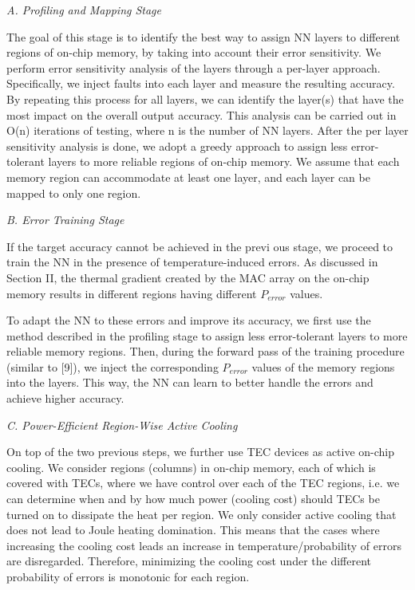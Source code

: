 \documentclass[sigconf]{acmart}
\begin{document}
\textit{A. Profiling and Mapping Stage} 

The goal of this stage is to identify the best way to assign NN layers to different regions of on-chip memory, by taking into account their error sensitivity. We perform error sensitivity analysis of the layers through a per-layer approach. Specifically, we inject faults into each layer and measure the resulting accuracy. By repeating this process for all layers, we can identify the layer(s) that have the most impact on the overall output accuracy. This analysis can be carried out in O(n) iterations of testing, where n is the number of NN layers. After the per layer sensitivity analysis is done, we adopt a greedy approach to assign less error-tolerant layers to more reliable regions of on-chip memory. We assume that each memory region can accommodate at least one layer, and each layer can be mapped to only one region. 

\textit{B. Error Training Stage} 

If the target accuracy cannot be achieved in the previ ous stage, we proceed to train the NN in the presence of temperature-induced errors. As discussed in Section II, the thermal gradient created by the MAC array on the on-chip memory results in different regions having different $P_{error}$ values. 

To adapt the NN to these errors and improve its accuracy, we first use the method described in the profiling stage to assign less error-tolerant layers to more reliable memory regions. Then, during the forward pass of the training procedure (similar to [9]), we inject the corresponding $P_{error}$ values of the memory regions into the layers. This way, the NN can learn to better handle the errors and achieve higher accuracy. 

\textit{C. Power-Efficient Region-Wise Active Cooling }

On top of the two previous steps, we further use TEC devices as active on-chip cooling. We consider regions (columns) in on-chip memory, each of which is covered with TECs, where we have control over each of the TEC regions, i.e. we can determine when and by how much power (cooling cost) should TECs be turned on to dissipate the heat per region. We only consider active cooling that does not lead to Joule heating domination. This means that the cases where increasing the cooling cost leads an increase in temperature/probability of errors are disregarded. Therefore, minimizing the cooling cost under the different probability of errors is monotonic for each region.
\end{document}
